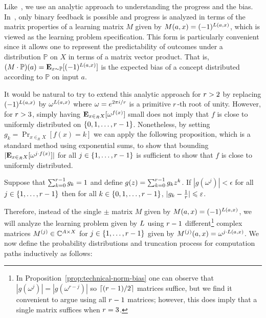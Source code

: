 Like~\cite{DBLP:conf/focs/Raz17}, we use an analytic approach to
understanding the progress and the bias. 
In~\cite{DBLP:conf/focs/Raz17}, only binary
feedback is possible and progress is analyzed in terms of the matrix properties
of a learning matrix $M$ given by $M(a,x)=(-1)^{L(a,x)}$, which is viewed
as the learning problem specification.  This form is particularly
convenient since it allows one to represent the predictability of outcomes
under a distribution $\mathbb{P}$ on $X$ in terms of a matrix vector product.
That is, $(M\cdot \mathbb{P})(a)={\mathbf E}_{x\sim \mathbb{P}}[(-1)^{L(a,x)}]$
is the expected bias of a concept distributed according to $\mathbb{P}$ on input
$a$.

It would be natural to try to extend this analytic approach for
$r>2$ by replacing
$(-1)^{L(a,x)}$ by $\omega^{L(a,x)}$ where $\omega=e^{2\pi i/r}$ is a
primitive $r$-th root of unity.   However, for $r>3$, simply
having ${\mathbf E}_{x\in_R X}[\omega^{f(x)}]$ small does not imply that $f$ is close to
uniformly distributed on $\{0,1,\ldots,r-1\}$.
Nonetheless, by setting $g_k=\Pr_{x\in_R X}[f(x)=k]$ we can apply the following
proposition, which is a standard method using exponential sums,
to show that bounding $|{\mathbf E}_{x\in_R X}[\omega^{j\cdot f(x)}]|$
for all $j\in \{1,\ldots,r-1\}$ is sufficient to show that $f$ is close to
uniformly distributed. 

\begin{proposition}
\label{prop:technical-norm-bias}
Suppose that $\sum_{k=0}^{r-1} g_k=1$ and
define $g(z)=\sum_{k=0}^{r-1} g_k z^k$.
If $|g(\omega^j)|< \epsilon$ for all $j\in \{1,\ldots,r-1\}$ then for all
$k\in \{0,1,\ldots,r-1\}$,  $|g_k-\frac{1}{r}|\leqslant \varepsilon$.
\end{proposition}

Therefore, instead of the single $\pm$ matrix $M$ given by
$M(a,x)=(-1)^{L(a,x)}$, we will analyze the learning problem given by $L$
using $r-1$ different\footnote{In Proposition~\ref{prop:technical-norm-bias}
one can observe that $|g(\omega^j)|=|g(\omega^{r-j})|$ so
$\lceil(r-1)/2\rceil$ matrices suffice, but we find it convenient to
argue using all $r-1$ matrices; however, this does imply that 
a single matrix suffices when $r=3$.}
complex matrices $M^{(j)}\in \mathbb{C}^{A\times X}$
for $j\in \{1,\ldots, r-1\}$
given by $M^{(j)}(a,x)=\omega^{j\cdot L(a,x)}$.  
We now define the
probability distributions and truncation process for computation paths
inductively as follows:


